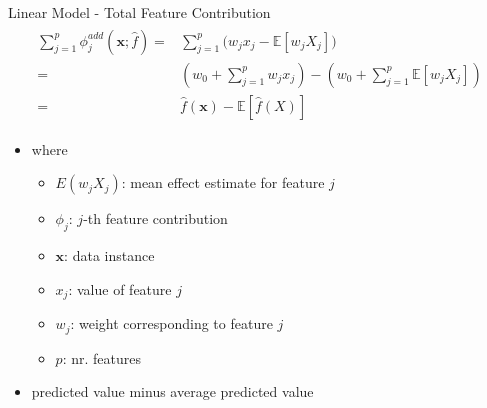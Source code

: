 \begin{frame}[shrink=20]{Linear Model - Total Feature Contribution}
	\begin{align}
		\begin{split}
			\sum_{j=1}^{p}\phi^{add}_j\left(\bm{x};\hat{f}\right) =&\sum_{j=1}^p\bigl(w_{j}x_j-\mathbb{E}\left[w_{j}X_{j}\right]\bigr)\\
			=&\left(w_0+\sum_{j=1}^pw_{j}x_j\right)-\left(w_0+\sum_{j=1}^{p}\mathbb{E}\left[w_{j}X_{j}\right]\right)\\
			=&\hat{f}(\bm{x})-\mathbb{E}\left[\hat{f}(X)\right]
		\end{split}
	\end{align}
	\begin{itemize}\setlength\itemsep{2em}
		\item[]
		where
		\begin{itemize}
			\item $E(w_{j}X_{j})$: mean effect estimate for feature $j$
			\item $\phi_j$: $j$-th feature contribution
			\item $\bm{x}$: data instance
			\item $x_j$: value of feature $j$
			\item $w_j$: weight corresponding to feature $j$
			\item $p$: nr. features
		\end{itemize}
		\item<2-> predicted value minus average predicted value
	\end{itemize}
\end{frame}